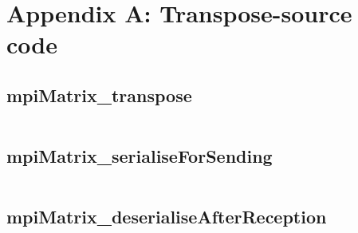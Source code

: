 \section{Appendix A: Transpose-source code}

\subsection{mpiMatrix\_transpose}
\inputminted{c}{transpose.c}
\subsection{mpiMatrix\_serialiseForSending}
\inputminted{c}{serialise.c}
\subsection{mpiMatrix\_deserialiseAfterReception}
\inputminted{c}{deserialise.c}
